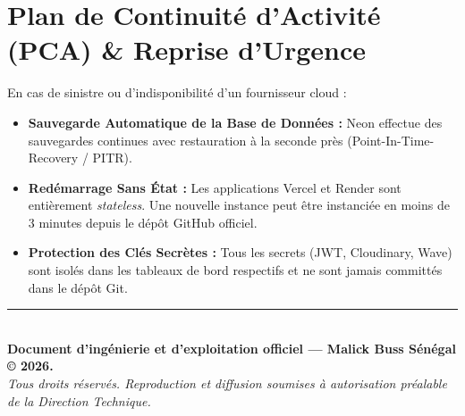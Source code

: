 \documentclass[11pt,a4paper,titlepage]{report}
\begin{document}
\section{Plan de Continuité d'Activité (PCA) \& Reprise d'Urgence}
En cas de sinistre ou d'indisponibilité d'un fournisseur cloud :
\begin{itemize}
    \item \textbf{Sauvegarde Automatique de la Base de Données :} Neon effectue des sauvegardes continues avec restauration à la seconde près (Point-In-Time-Recovery / PITR).
    \item \textbf{Redémarrage Sans État :} Les applications Vercel et Render sont entièrement \textit{stateless}. Une nouvelle instance peut être instanciée en moins de 3 minutes depuis le dépôt GitHub officiel.
    \item \textbf{Protection des Clés Secrètes :} Tous les secrets (JWT, Cloudinary, Wave) sont isolés dans les tableaux de bord respectifs et ne sont jamais committés dans le dépôt Git.
\end{itemize}

\vfill
\begin{center}
    \rule{0.5\linewidth}{0.5pt}\\[0.2cm]
    \textbf{Document d'ingénierie et d'exploitation officiel — Malick Buss Sénégal © 2026.}\\
    \textit{Tous droits réservés. Reproduction et diffusion soumises à autorisation préalable de la Direction Technique.}
\end{center}
\end{document}

